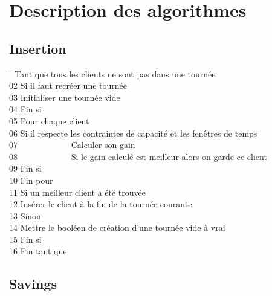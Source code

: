 \documentclass[12pt]{article}
\begin{document}
\clearpage
\section{Description des algorithmes}

\subsection{Insertion}

\begin{tabbing}
\hspace{1cm} \= \hspace{1cm} \=   Tant que tous les clients ne sont pas dans une tournée\\
02  \> Si il faut recréer une tournée\\
03  \> \> Initialiser une tournée vide \\
04  \> Fin si\\
05  \> Pour chaque client\\
06  \> \> Si il respecte les contraintes de capacité et les fenêtres de temps \\
07  \> \> \ \ \ \ \ \ \ \ \ \ \ \ Calculer son gain\\
08  \> \> \ \ \ \ \ \ \ \ \ \ \ \ Si le gain calculé est meilleur alors on garde ce client \\
09  \> \> Fin si \\
10  \> Fin pour \\
11  \> Si un meilleur client a été trouvée \\
12  \> \> Insérer le client à la fin de la tournée courante\\
13  \> Sinon \\
14  \> \> Mettre le booléen de création d'une tournée vide à vrai \\
15  \> Fin si \\
16  Fin tant que \\
\end{tabbing}

\subsection{Savings}
\end{document}
